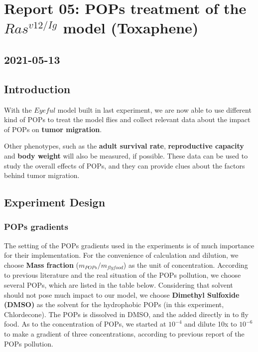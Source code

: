 \newpage
\section{Report 05: POPs treatment of the $Ras^{v12/Ig}$ model (Toxaphene)}

\subsection*{2021-05-13}

\subsection{Introduction}

With the $Eyeful$ model built in last experiment, we are now able to use different kind of POPs to treat the model flies and collect relevant data about the impact of POPs on \textbf{tumor migration}.

Other phenotypes, such as the \textbf{adult survival rate}, \textbf{reproductive capacity} and \textbf{body weight} will also be measured, if possible. These data can be used to study the overall effects of POPs, and they can provide clues about the factors behind tumor migration.

\subsection{Experiment Design}

\subsubsection{POPs gradients}
The setting of the POPs gradients used in the experiments is of much importance for their implementation.
For the convenience of calculation and dilution, we choose \textbf{Mass fraction} ($m_{POPs}/m_{fly food}$) as the unit of concentration.
According to previous literature and the real situation of the POPs pollution, we choose several POPs, which are listed in the table below. Considering that solvent should not pose much impact to our model, we choose \textbf{Dimethyl Sulfoxide (DMSO)} as the solvent for the hydrophobic POPs (in this experiment, Chlordecone). The POPs is dissolved in DMSO, and the added directly in to fly food.
As to the concentration of POPs, we started at $10^{-4}$ and dilute 10x to $10^{-6}$ to make a gradient of three concentrations, according to previous report of the POPs pollution.


